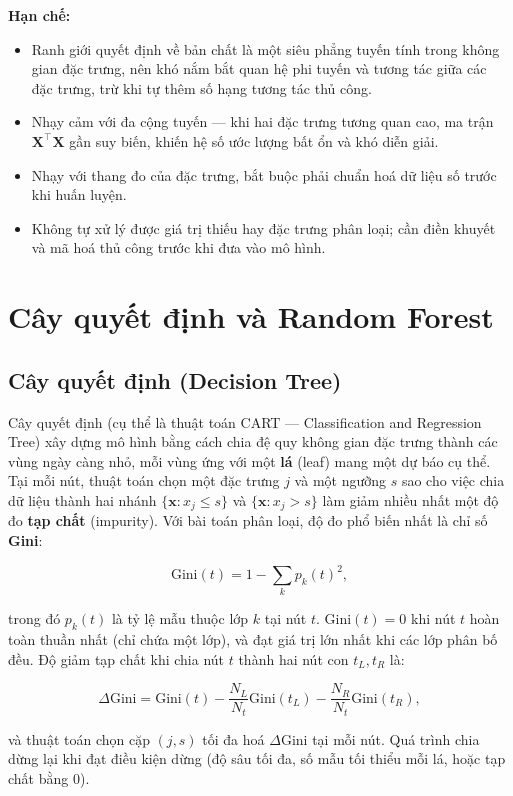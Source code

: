 \documentclass[a4paper]{article}
\begin{document}
\textbf{Hạn chế:}
\begin{itemize}[leftmargin=*]
  \item Ranh giới quyết định về bản chất là một siêu phẳng tuyến tính trong
        không gian đặc trưng, nên khó nắm bắt quan hệ phi tuyến và tương tác
        giữa các đặc trưng, trừ khi tự thêm số hạng tương tác thủ công.
  \item Nhạy cảm với đa cộng tuyến --- khi hai đặc trưng tương quan cao, ma
        trận $\mathbf{X}^\top \mathbf{X}$ gần suy biến, khiến hệ số ước lượng
        bất ổn và khó diễn giải.
  \item Nhạy với thang đo của đặc trưng, bắt buộc phải chuẩn hoá dữ liệu số
        trước khi huấn luyện.
  \item Không tự xử lý được giá trị thiếu hay đặc trưng phân loại; cần điền
        khuyết và mã hoá thủ công trước khi đưa vào mô hình.
\end{itemize}

\section{Cây quyết định và Random Forest}

\subsection{Cây quyết định (Decision Tree)}

Cây quyết định (cụ thể là thuật toán CART --- Classification and Regression
Tree) xây dựng mô hình bằng cách chia đệ quy không gian đặc trưng thành các
vùng ngày càng nhỏ, mỗi vùng ứng với một \textbf{lá} (leaf) mang một dự báo cụ
thể. Tại mỗi nút, thuật toán chọn một đặc trưng $j$ và một ngưỡng $s$ sao cho
việc chia dữ liệu thành hai nhánh $\{\mathbf{x} : x_j \le s\}$ và
$\{\mathbf{x} : x_j > s\}$ làm giảm nhiều nhất một độ đo \textbf{tạp chất}
(impurity). Với bài toán phân loại, độ đo phổ biến nhất là chỉ số
\textbf{Gini}:

\[
  \text{Gini}(t) = 1 - \sum_{k} p_k(t)^2,
\]

trong đó $p_k(t)$ là tỷ lệ mẫu thuộc lớp $k$ tại nút $t$. Gini$(t) = 0$ khi nút
$t$ hoàn toàn thuần nhất (chỉ chứa một lớp), và đạt giá trị lớn nhất khi các
lớp phân bố đều. Độ giảm tạp chất khi chia nút $t$ thành hai nút con
$t_L, t_R$ là:

\[
  \Delta \text{Gini} = \text{Gini}(t) - \frac{N_L}{N_t}\text{Gini}(t_L)
  - \frac{N_R}{N_t}\text{Gini}(t_R),
\]

và thuật toán chọn cặp $(j, s)$ tối đa hoá $\Delta \text{Gini}$ tại mỗi nút.
Quá trình chia dừng lại khi đạt điều kiện dừng (độ sâu tối đa, số mẫu tối
thiểu mỗi lá, hoặc tạp chất bằng 0).
\end{document}

